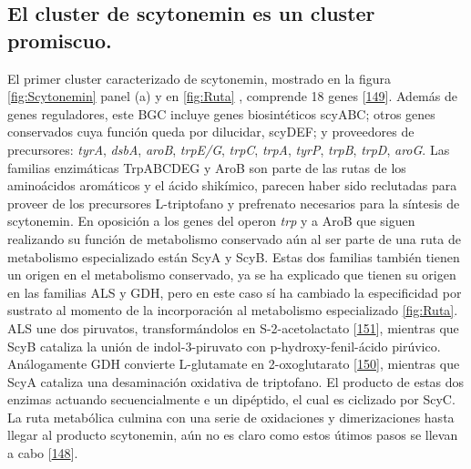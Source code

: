 \documentclass[12pt,twoside]{reedthesis}
\begin{document}
  \subsection{El cluster de scytonemin es un cluster
  promiscuo.}\label{el-cluster-de-scytonemin-es-un-cluster-promiscuo.}
  
  El primer cluster caracterizado de scytonemin, mostrado en la figura
  \autoref{fig:Scytonemin} panel (a) y en \autoref{fig:Ruta} , comprende
  18 genes {[}\protect\hyperlink{ref-soule_comparative_2009}{149}{]}.
  Además de genes reguladores, este BGC incluye genes biosintéticos
  scyABC; otros genes conservados cuya función queda por dilucidar,
  scyDEF; y proveedores de precursores: \emph{tyrA}, \emph{dsbA},
  \emph{aroB}, \emph{trpE/G}, \emph{trpC}, \emph{trpA}, \emph{tyrP},
  \emph{trpB}, \emph{trpD}, \emph{aroG}. Las familias enzimáticas
  TrpABCDEG y AroB son parte de las rutas de los aminoácidos aromáticos y
  el ácido shikímico, parecen haber sido reclutadas para proveer de los
  precursores L-triptofano y prefrenato necesarios para la síntesis de
  scytonemin. En oposición a los genes del operon \emph{trp} y a AroB que
  siguen realizando su función de metabolismo conservado aún al ser parte
  de una ruta de metabolismo especializado están ScyA y ScyB. Estas dos
  familias también tienen un origen en el metabolismo conservado, ya se ha
  explicado que tienen su origen en las familias ALS y GDH, pero en este
  caso sí ha cambiado la especificidad por sustrato al momento de la
  incorporación al metabolismo especializado \autoref{fig:Ruta}. ALS une
  dos piruvatos, transformándolos en S-2-acetolactato
  {[}\protect\hyperlink{ref-liu_acetohydroxyacid_2016}{151}{]}, mientras
  que ScyB cataliza la unión de indol-3-piruvato con p-hydroxy-fenil-ácido
  pirúvico. Análogamente GDH convierte L-glutamate en 2-oxoglutarato
  {[}\protect\hyperlink{ref-engel_glutamate_2014}{150}{]}, mientras que
  ScyA cataliza una desaminación oxidativa de triptofano. El producto de
  estas dos enzimas actuando secuencialmente e un dipéptido, el cual es
  ciclizado por ScyC. La ruta metabólica culmina con una serie de
  oxidaciones y dimerizaciones hasta llegar al producto scytonemin, aún no
  es claro como estos útimos pasos se llevan a cabo
  {[}\protect\hyperlink{ref-balskus_investigating_2008}{148}{]}.
  
\end{document}
